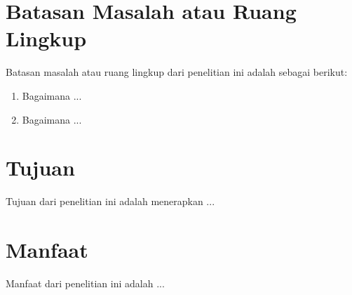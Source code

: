 \section{Batasan Masalah atau Ruang Lingkup}

Batasan masalah atau ruang lingkup dari penelitian ini adalah sebagai berikut:
\begin{enumerate}
  \vspace{-0.3cm}\item{Bagaimana ...}
  \vspace{-0.3cm}\item{Bagaimana ...}
\end{enumerate}

\section{Tujuan}

Tujuan dari penelitian ini adalah menerapkan ...

\section{Manfaat}

Manfaat dari penelitian ini adalah ...
